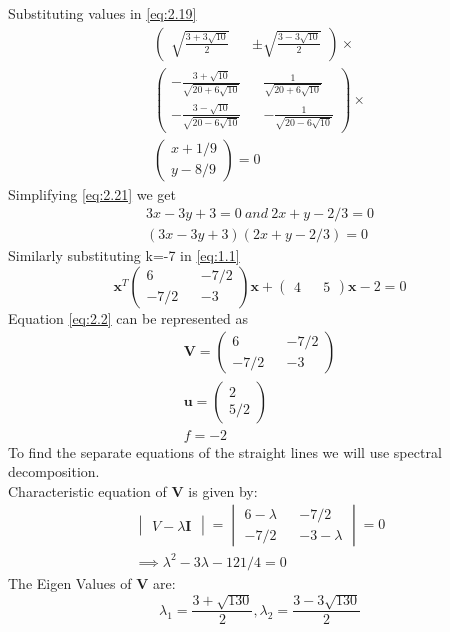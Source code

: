 \documentclass[journal,13pt,twocolumn]{IEEEtran}
\newcommand{\myvec}[1]{\ensuremath{\begin{pmatrix}#1\end{pmatrix}}}
\newcommand{\mydet}[1]{\ensuremath{\begin{vmatrix}#1\end{vmatrix}}}
\renewcommand{\vec}[1]{\mathbf{#1}}
\begin{document}
Substituting values in \eqref{eq:2.19}
\begin{equation} \label{eq:2.21}
\begin{split}
\myvec{ \sqrt{\frac{3+3\sqrt{10}}{2}} && \pm\sqrt{\frac{3-3\sqrt{10}}{2}}} \times \\
\myvec{ -\frac{3+\sqrt{10}}{\sqrt{20+6\sqrt{10}}} && \frac{1}{\sqrt{20+6\sqrt{10}}} \\ -\frac{3-\sqrt{10}}{\sqrt{20-6\sqrt{10}}} && -\frac{1}{\sqrt{20-6\sqrt{10}}}} \times \\
\myvec{x+1/9 \\ y-8/9}  = 0
\end{split}
\end{equation}
Simplifying \eqref{eq:2.21} we get 
\begin{equation}\label{eq:2.22}
\begin{split}
3x - 3y + 3 = 0 ~and~ 2x + y - 2/3 = 0\\
\boxed{(3x - 3y + 3)(2x + y - 2/3) = 0}
\end{split}
\end{equation}
Similarly substituting k=-7 in \eqref{eq:1.1}
\begin{equation}\label{eq:2.23}
\vec{x}^T \myvec{6 && -7/2 \\ -7/2 && -3} \vec{x} + \myvec{4 && 5}\vec{x} -2 = 0
\end{equation}
Equation \eqref{eq:2.2} can be represented as 
\begin{equation} \label{2.24}
\begin{split}
\vec{V}=\myvec{6 && -7/2\\ -7/2 && -3}\\
\vec{u}=\myvec{2\\5/2}\\
f= -2
\end{split}
\end{equation}
To find the separate equations of the straight lines we will use spectral decomposition.\\
Characteristic equation of $\vec{V}$ is given by:
\begin{equation} \label{2.25}
\begin{split}
\mydet{V-\lambda \vec{I}}=\mydet{6-\lambda && -7/2\\ -7/2 && -3-\lambda} = 0\\
\implies \lambda^2 - 3\lambda - 121/4 = 0
\end{split}
\end{equation}
The Eigen Values of $\vec{V}$ are:
\begin{equation} \label{2.26}
\lambda_1 = \frac{3+\sqrt{130}}{2}, \lambda_2 = \frac{3-3\sqrt{130}}{2}
\end{equation}
\end{document}
